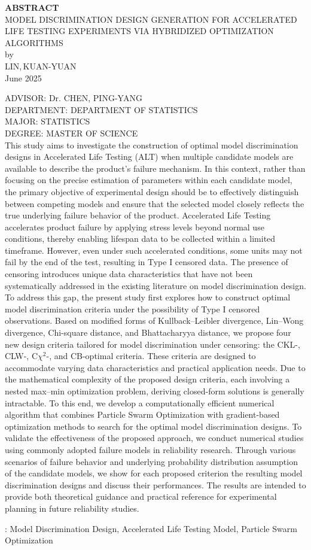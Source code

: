 \newpage
\fontsize{12}{18pt}\selectfont
\begin{center}{\Large \bf ABSTRACT}\\[20pt]
    {\large MODEL DISCRIMINATION DESIGN GENERATION FOR ACCELERATED LIFE TESTING EXPERIMENTS VIA HYBRIDIZED OPTIMIZATION ALGORITHMS}\\[10pt]
    by\\[10pt] LIN,\,KUAN-YUAN\\[10pt] June 2025
\end{center}
{\small ADVISOR: Dr. CHEN, PING-YANG  \\[5pt]
        DEPARTMENT: DEPARTMENT OF STATISTICS\\[5pt]
        MAJOR: STATISTICS\\[5pt]
        DEGREE: MASTER OF SCIENCE}\\[10pt]
\noindent
This study aims to investigate the construction of optimal model discrimination designs in Accelerated Life Testing (ALT) when multiple candidate models are available to describe the product's failure mechanism. In this context, rather than focusing on the precise estimation of parameters within each candidate model, the primary objective of experimental design should be to effectively distinguish between competing models and ensure that the selected model closely reflects the true underlying failure behavior of the product. Accelerated Life Testing accelerates product failure by applying stress levels beyond normal use conditions, thereby enabling lifespan data to be collected within a limited timeframe. However, even under such accelerated conditions, some units may not fail by the end of the test, resulting in Type I censored data. The presence of censoring introduces unique data characteristics that have not been systematically addressed in the existing literature on model discrimination design. To address this gap, the present study first explores how to construct optimal model discrimination criteria under the possibility of Type I censored observations. Based on modified forms of Kullback–Leibler divergence, Lin–Wong divergence, Chi-square distance, and Bhattacharyya distance, we propose four new design criteria tailored for model discrimination under censoring: the CKL-, CLW-, C$\chi^2$-, and CB-optimal criteria. These criteria are designed to accommodate varying data characteristics and practical application needs. Due to the mathematical complexity of the proposed design criteria, each involving a nested max–min optimization problem, deriving closed-form solutions is generally intractable. To this end, we develop a computationally efficient numerical algorithm that combines Particle Swarm Optimization with gradient-based optimization methods to search for the optimal model discrimination designs. To validate the effectiveness of the proposed approach, we conduct numerical studies using commonly adopted failure models in reliability research. Through various scenarios of failure behavior and underlying probability distribution assumption of the candidate models, we show for each proposed criterion the resulting model discrimination designs and discuss their performances. The results are intended to provide both theoretical guidance and practical reference for experimental planning in future reliability studies.

\vspace*{2cm}
: Model Discrimination Design, Accelerated Life Testing Model, Particle Swarm Optimization


